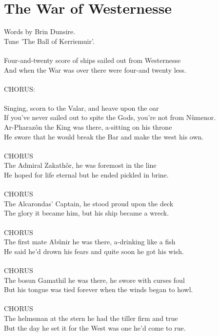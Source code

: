 \section{The War of Westernesse}
Words by Brin Dunsire.
\\
Tune 'The Ball of Kerriemuir'.
\\
\\
Four-and-twenty score of ships sailed out from Westernesse
\\
And when the War was over there were four-and twenty less.
\\
\\CHORUS:\\
\\
Singing, scorn to the Valar, and heave upon the oar
\\
If you’ve never sailed out to spite the Gods, you’re not from N\`umenor.
\\
Ar-Pharaz\^on the King was there, a-sitting on his throne
\\
He swore that he would break the Bar and make the west his own.
\\
\\CHORUS
\\
The Admiral Zakath\^or, he was foremost in the line
\\
He hoped for life eternal but he ended pickled in brine.
\\
\\CHORUS
\\
The Alcarondas’ Captain, he stood proud upon the deck
\\
The glory it became him, but his ship became a wreck.
\\
\\CHORUS
\\
The first mate Ab\^unir he was there, a-drinking like a fish
\\
He said he’d drown his fears and quite soon he got his wish.
\\
\\CHORUS
\\
The bosun Gamathil he was there, he swore with curses foul
\\
But his tongue was tied forever when the winds began to howl.
\\
\\CHORUS
\\
The helmsman at the stern he had the tiller firm and true
\\
But the day he set it for the West was one he’d come to rue.
\\
